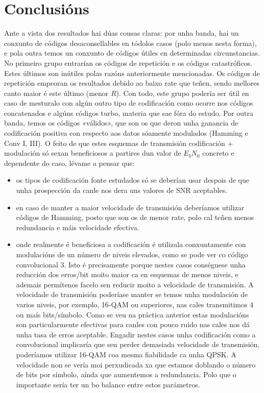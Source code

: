 \documentclass[
	10pt, %
	spanish, %
]{fphw}
\begin{document}
\section*{Conclusións}
Ante a vista dos resultados hai dúas cousas claras: por unha banda, hai un conxunto de códigos desaconsellables en tódolos casos (polo menos nesta forma), e pola outra temos un conxunto de códigos útiles en determinadas circunstancias.
No primeiro grupo entrarían os códigos de repetición e os códigos catastróficos. Estes últimos son inútiles polas razóns anteriormente mencionadas. Os códigos de repetición empeoran os resultados debido ao baixo rate que teñen, sendo mellores canto maior é este último (menor $R$). Con todo, este grupo podería ser útil en caso de mesturalo con algún outro tipo de codificación como ocorre nos códigos concatenados e algúns códigos turbo, materia que sae fóra do estudo.
Por outra banda, temos os códigos «válidos», que son os que deron unha ganancia de codificación positiva con respecto aos datos sóamente modulados (Hamming e Conv I, III).
O feito de que estes esquemas de transmisión codificación + modulación só sexan beneficiosos a partires dun valor de $E_bN_0$ concreto e dependente do caso, lévame a pensar que:
\begin{itemize}
\item os tipos de codificación fonte estudados só se deberían usar despois de que unha prospección da canle nos dera uns valores de SNR aceptables.
\item en caso de manter a maior velocidade de transmisión deberíamos utilizar códigos de Hamming, posto que son os de menor rate, polo cal teñen menos redundancia e máis velocidade efectiva.
\item onde realmente é beneficiosa a codificación é utilizala conxuntamente con modulacións de un número de niveis elevados, como se pode ver co código convolucional 3.
Isto é precisamente porque nestes casos conséguese unha reducción dos erros/bit moito maior ca en esquemas de menos niveis, e ademais permítenos facelo sen reducir moito a velocidade de transmisión.
A velocidade de transmisión poderíase manter se temos unha modulación de varios niveis, por exemplo, 16-QAM ou superiores, nas cales transmitimos 4 ou maís bits/símbolo. 
Como se veu na práctica anterior estas modulacións son particularmente efectivas para canles con pouco ruido nas cales nos dá unha tasa de erros aceptable. 
Engadir nestes casos unha codificación como a convolucional implicaría que sen perder demasiada velocidade de transmisión, poderíamos utilizar 16-QAM coa mesma fiabilidade ca unha QPSK. 
A velocidade non se vería moi perxudicada xa que estamos doblando o número de bits por símbolo, aínda que aumentemos a redundancia. Polo que o importante sería ter un bo balance entre estos parámetros.
\end{itemize}
\end{document}
